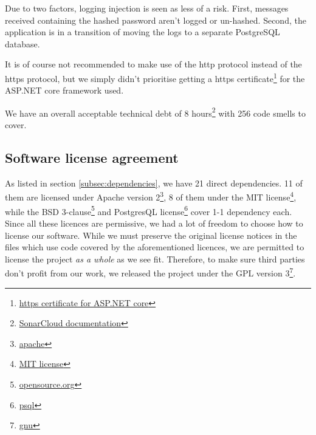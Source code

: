 \documentclass[report/main.tex]{subfiles}
\begin{document}
            Due to two factors, logging injection is seen as less of a risk. First, messages received containing the hashed password aren't logged or un-hashed. Second, the application is in a transition of moving the logs to a separate PostgreSQL database.
            
            It is of course not recommended to make use of the http protocol instead of the https protocol, but we simply didn't prioritise getting a https certificate\footnote{\href{https://docs.microsoft.com/en-us/aspnet/core/security/enforcing-ssl?view=aspnetcore-5.0\&tabs=visual-studio}{https certificate for ASP.NET core}} for the ASP.NET core framework used.
            
            We have an overall acceptable technical debt of 8 hours\footnote{\href{https://docs.sonarqube.org/latest/user-guide/metric-definitions/#header-4}{SonarCloud documentation}} with 256 code smells to cover.
    
        \subsection{Software license agreement}
            As listed in section \ref{subsec:dependencies}, we have 21 direct dependencies. 11 of them are licensed under Apache version 2\footnote{\href{https://www.apache.org/licenses/LICENSE-2.0}{apache}}, 8 of them under the MIT license\footnote{\href{https://opensource.org/licenses/MIT}{MIT license}}, while the BSD 3-clause\footnote{\href{https://opensource.org/licenses/BSD-3-Clause}{opensource.org}} and PostgresQL license\footnote{\href{https://www.postgresql.org/about/licence/}{psql}} cover 1-1 dependency each. Since all these licences are permissive, we had a lot of freedom to choose how to license our software. While we must preserve the original license notices in the files which use code covered by the aforementioned licences, we are permitted to license the project \textit{as a whole} as we see fit. Therefore, to make sure third parties don't profit from our work, we released the project under the GPL version 3\footnote{\href{https://www.gnu.org/licenses/gpl-3.0.en.html}{gnu}}.
    
\end{document}
